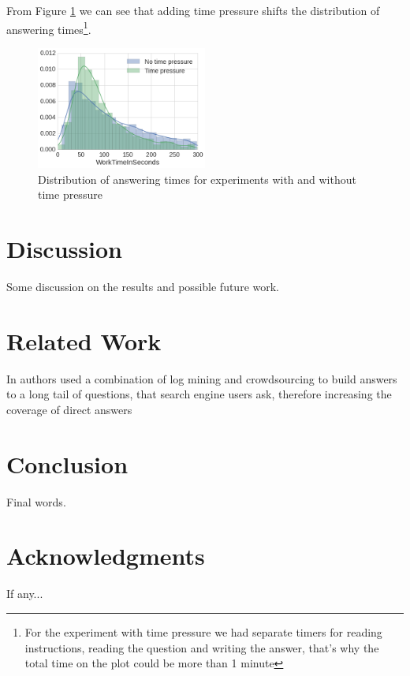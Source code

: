\documentclass[11pt,letterpaper]{article}
\begin{document}
From Figure \ref{fig:answering_time_distribution} we can see that adding time pressure shifts the distribution of answering times\footnote{For the experiment with time pressure we had separate timers for reading instructions, reading the question and writing the answer, that's why the total time on the plot could be more than 1 minute}.

\begin{figure}[h]
	\centering
	\includegraphics[width=0.5\textwidth]{img/answering_time_distribution}
	\caption{Distribution of answering times for experiments with and without time pressure}
	\label{fig:answering_time_distribution}
\end{figure}


\section{Discussion}
\label{sec:discussion}

Some discussion on the results and possible future work.

\section{Related Work}
\label{sec:related_work}

In \cite{bernstein2012direct} authors used a combination of log mining and crowdsourcing to build answers to a long tail of questions, that search engine users ask, therefore increasing the coverage of direct answers

\section{Conclusion}
\label{sec:conclusion}

Final words.

\section*{Acknowledgments}

If any...



\end{document}
